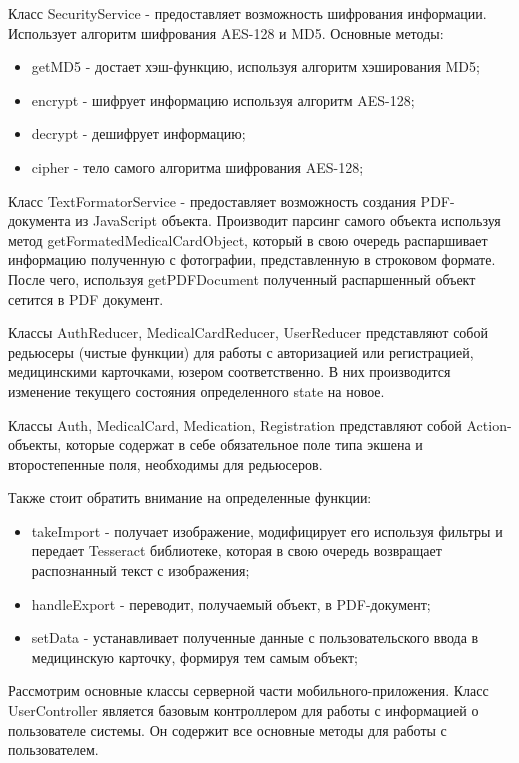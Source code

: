 Класс SecurityService - предоставляет возможность шифрования информации. Использует алгоритм шифрования AES-128 и MD5. Основные методы:
\begin{itemize}
  \item getMD5 - достает хэш-функцию, используя алгоритм хэширования MD5;
  \item encrypt - шифрует информацию используя алгоритм AES-128;
  \item decrypt - дешифрует информацию;
  \item cipher - тело самого алгоритма шифрования AES-128;
\end{itemize}

Класс TextFormatorService - предоставляет возможность создания PDF-документа из JavaScript объекта. Производит парсинг самого объекта используя метод getFormatedMedicalCardObject, который в свою очередь распаршивает информацию полученную с фотографии, представленную в строковом формате. После чего, используя getPDFDocument полученный распаршенный объект сетится в PDF документ.

Классы AuthReducer, MedicalCardReducer, UserReducer представляют собой редьюсеры (чистые функции) для работы с авторизацией или регистрацией, медицинскими карточками, юзером соответственно. В них производится изменение текущего состояния определенного state на новое.

Классы Auth, MedicalCard, Medication, Registration представляют собой Action-объекты, которые содержат в себе обязательное поле типа экшена и второстепенные поля, необходимы для редьюсеров.

Также стоит обратить внимание на определенные функции:
\begin{itemize}
  \item takeImport - получает изображение, модифицирует его используя фильтры и передает Tesseract библиотеке, которая в свою очередь возвращает распознанный текст с изображения;
  \item handleExport - переводит, получаемый объект, в PDF-документ;
  \item setData - устанавливает полученные данные с пользовательского ввода в медицинскую карточку, формируя тем самым объект;
\end{itemize}

Рассмотрим основные классы серверной части мобильного-приложения. Класс UserController является базовым контроллером для работы с информацией о пользователе системы. Он содержит все основные методы для работы с пользователем.

